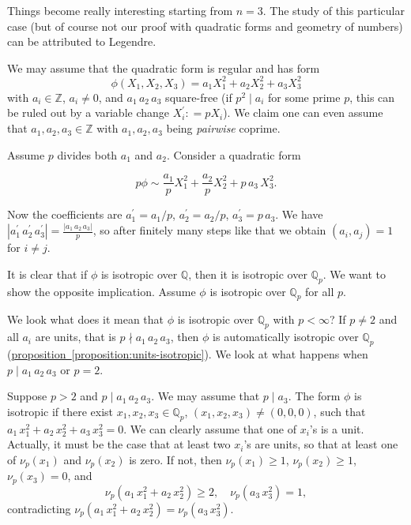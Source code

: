 \documentclass{article}
\newcommand{\dfn}{\mathrel{\mathop:}=}
\newcommand{\ZZ}{\mathbb{Z}}
\newcommand{\QQ}{\mathbb{Q}}
\newcommand{\refref}[2]{\hyperref[#2]{#1~\ref*{#2}}}
\theoremstyle{myplain}
\theoremstyle{mydefinition}
\begin{document}
Things become really interesting starting from $n = 3$. The study of this
particular case (but of course not our proof with quadratic forms and geometry
of numbers) can be attributed to Legendre.

We may assume that the quadratic form is regular and has form
$$\phi (X_1,X_2,X_3) = a_1 X_1^2 + a_2 X_2^2 + a_3 X_3^2$$
with $a_i \in \ZZ$, $a_i \ne 0$, and $a_1\,a_2\,a_3$ square-free (if
$p^2 \mid a_i$ for some prime $p$, this can be ruled out by a variable change
$X^\prime_i \dfn p X_i$). We claim one can even assume that
$a_1,a_2,a_3 \in \ZZ$ with $a_1,a_2,a_3$ being \emph{pairwise} coprime.

Assume $p$ divides both $a_1$ and $a_2$. Consider a quadratic form

\[ p\phi \sim \frac{a_1}{p} X_1^2 + \frac{a_2}{p} X_2^2 + p\,a_3\,X_3^2. \]

Now the coefficients are $a_1^\prime = a_1/p$, $a_2^\prime = a_2/p$,
$a_3^\prime = p\,a_3$. We have
$|a_1^\prime\,a_2^\prime\,a_3^\prime| = \frac{|a_1\,a_2\,a_3|}{p}$, so after
finitely many steps like that we obtain $(a_i,a_j) = 1$ for $i \ne j$.

\vspace{1em}

It is clear that if $\phi$ is isotropic over $\QQ$, then it is isotropic over
$\QQ_p$. We want to show the opposite implication. Assume $\phi$ is isotropic
over $\QQ_p$ for all $p$.

\vspace{1em}

We look what does it mean that $\phi$ is isotropic over $\QQ_p$ with
$p < \infty$? If $p \ne 2$ and all $a_i$ are units, that is
$p \nmid a_1\,a_2\,a_3$, then $\phi$ is automatically isotropic over $\QQ_p$
(\refref{proposition}{proposition:units-isotropic}). We look at what happens
when $p \mid a_1\,a_2\,a_3$ or $p = 2$.

Suppose $p > 2$ and $p \mid a_1\,a_2\,a_3$. We may assume that $p \mid a_3$. The
form $\phi$ is isotropic if there exist $x_1,x_2,x_3 \in \QQ_p$,
$(x_1,x_2,x_3) \ne (0,0,0)$, such that
$a_1\,x_1^2 + a_2\,x_2^2 + a_3\,x_3^2 = 0$. We can clearly assume that one of
$x_i$'s is a unit. Actually, it must be the case that at least two $x_i$'s are
units, so that at least one of $ \nu_p (x_1)$ and $ \nu_p (x_2)$ is zero. If
not, then $ \nu_p (x_1) \ge 1$, $ \nu_p (x_2) \ge 1$, $ \nu_p (x_3) = 0$, and
$$\nu_p (a_1\,x_1^2 + a_2\,x_2^2) \ge 2, \quad \nu_p (a_3\,x_3^2) = 1,$$
contradicting $\nu_p (a_1\,x_1^2 + a_2\,x_2^2) = \nu_p (a_3\,x_3^2)$.
\end{document}
